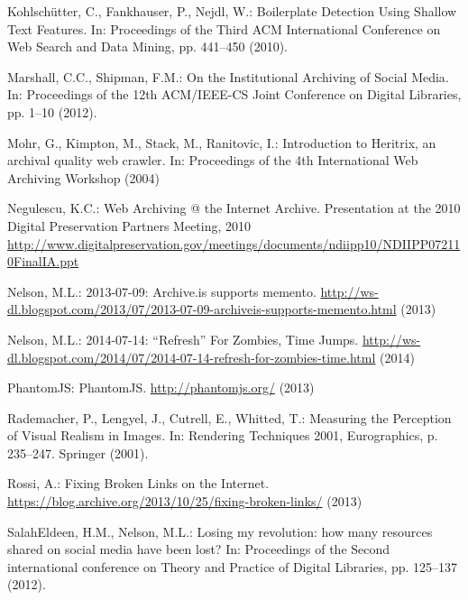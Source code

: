 \begin{thebibliography}{10}
Kohlsch\"{u}tter, C., Fankhauser, P., Nejdl, W.: {Boilerplate Detection Using
  Shallow Text Features}.
\newblock In: Proceedings of the Third ACM International Conference on Web
  Search and Data Mining, pp. 441--450 (2010).
\newblock {}

Marshall, C.C., Shipman, F.M.: {On the Institutional Archiving of Social
  Media}.
\newblock In: {Proceedings of the 12th ACM/IEEE-CS Joint Conference on Digital
  Libraries}, pp. 1--10 (2012).
\newblock {}

Mohr, G., Kimpton, M., Stack, M., Ranitovic, I.: {Introduction to Heritrix, an
  archival quality web crawler}.
\newblock In: Proceedings of the 4th International Web Archiving Workshop
  (2004)

Negulescu, K.C.: {Web Archiving @ the Internet Archive}.
\newblock Presentation at the 2010 Digital Preservation Partners Meeting, 2010
  \url{http://www.digitalpreservation.gov/meetings/documents/ndiipp10/NDIIPP072110FinalIA.ppt}

Nelson, M.L.: 2013-07-09: Archive.is supports memento.
\newblock
  \url{http://ws-dl.blogspot.com/2013/07/2013-07-09-archiveis-supports-memento.html}
  (2013)

Nelson, M.L.: {2014-07-14: ``Refresh'' For Zombies, Time Jumps}.
\newblock
  \url{http://ws-dl.blogspot.com/2014/07/2014-07-14-refresh-for-zombies-time.html}
  (2014)

{PhantomJS}: {PhantomJS}.
\newblock \url{http://phantomjs.org/} (2013)

Rademacher, P., Lengyel, J., Cutrell, E., Whitted, T.: {Measuring the
  Perception of Visual Realism in Images}.
\newblock In: Rendering Techniques 2001, Eurographics, p. 235–247. Springer
  (2001).
\newblock {}

Rossi, A.: {Fixing Broken Links on the Internet}.
\newblock \url{https://blog.archive.org/2013/10/25/fixing-broken-links/} (2013)

SalahEldeen, H.M., Nelson, M.L.: Losing my revolution: how many resources
  shared on social media have been lost?
\newblock In: {Proceedings of the Second international conference on Theory and
  Practice of Digital Libraries}, pp. 125--137 (2012).
\newblock {}


\end{thebibliography}
